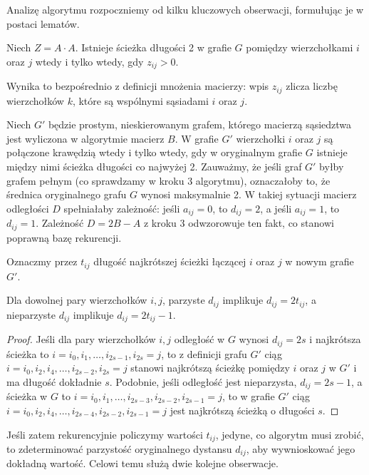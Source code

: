 Analizę algorytmu rozpoczniemy od kilku kluczowych obserwacji, formułując je w postaci lematów.

\begin{lemat}
Niech $Z = A \cdot A$. Istnieje ścieżka długości 2 w grafie $G$ pomiędzy wierzchołkami $i$ oraz $j$ wtedy i tylko wtedy, gdy $z_{ij} > 0$.
\end{lemat}

Wynika to bezpośrednio z definicji mnożenia macierzy: wpis $z_{ij}$ zlicza liczbę wierzchołków $k$, które są wspólnymi sąsiadami $i$ oraz $j$.

Niech $G'$ będzie prostym, nieskierowanym grafem, którego macierzą sąsiedztwa jest wyliczona w algorytmie macierz $B$. W grafie $G'$ wierzchołki $i$ oraz $j$ są połączone krawędzią wtedy i tylko wtedy, gdy w oryginalnym grafie $G$ istnieje między nimi ścieżka długości co najwyżej 2. Zauważmy, że jeśli graf $G'$ byłby grafem pełnym (co sprawdzamy w kroku 3 algorytmu), oznaczałoby to, że średnica oryginalnego grafu $G$ wynosi maksymalnie 2. W takiej sytuacji macierz odległości $D$ spełniałaby zależność: jeśli $a_{ij} = 0$, to $d_{ij} = 2$, a jeśli $a_{ij} = 1$, to $d_{ij} = 1$. Zależność $D = 2B - A$ z kroku 3 odwzorowuje ten fakt, co stanowi poprawną bazę rekurencji.

Oznaczmy przez $t_{ij}$ długość najkrótszej ścieżki łączącej $i$ oraz $j$ w nowym grafie $G'$.

\begin{lemat}
Dla dowolnej pary wierzchołków $i, j$, parzyste $d_{ij}$ implikuje $d_{ij} = 2t_{ij}$, a nieparzyste $d_{ij}$ implikuje $d_{ij} = 2t_{ij} - 1$.
\end{lemat}

\begin{proof}
Jeśli dla pary wierzchołków $i, j$ odległość w $G$ wynosi $d_{ij} = 2s$ i najkrótsza ścieżka to $i = i_0, i_1, \ldots, i_{2s-1}, i_{2s} = j$, to z definicji grafu $G'$ ciąg $i = i_0, i_2, i_4, \ldots, i_{2s-2}, i_{2s} = j$ stanowi najkrótszą ścieżkę pomiędzy $i$ oraz $j$ w $G'$ i ma długość dokładnie $s$. Podobnie, jeśli odległość jest nieparzysta, $d_{ij} = 2s - 1$, a ścieżka w $G$ to $i = i_0, i_1, \ldots, i_{2s-3}, i_{2s-2}, i_{2s-1} = j$, to w grafie $G'$ ciąg $i = i_0, i_2, i_4, \ldots, i_{2s-4}, i_{2s-2}, i_{2s-1} = j$ jest najkrótszą ścieżką o długości $s$.
\end{proof}

Jeśli zatem rekurencyjnie policzymy wartości $t_{ij}$, jedyne, co algorytm musi zrobić, to zdeterminować parzystość oryginalnego dystansu $d_{ij}$, aby wywnioskować jego dokładną wartość. Celowi temu służą dwie kolejne obserwacje.

